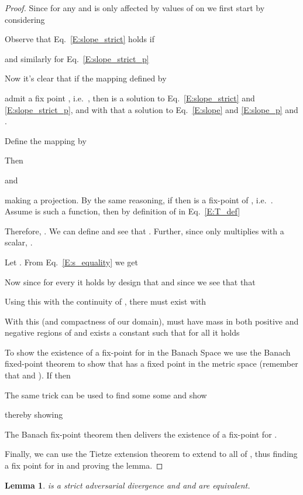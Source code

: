 \documentclass{article}
\newtheorem{lemma}{Lemma}
\begin{document}
 \begin{proof}
  Since  for any  and is only affected by
  values of  on  we first start by considering
  
  Observe that Eq.\ \ref{E:slope_strict} holds if
 
 and similarly for Eq.\ \ref{E:slope_strict_p}
 
 Now it's clear that if the mapping  defined by
 
  admit a fix point , i.e.\ , then  is a solution to Eq.\ \ref{E:slope_strict} and \ref{E:slope_strict_p},
  and with that a solution to Eq.\ \ref{E:slope} and \ref{E:slope_p} and .

  Define the mapping  by
  
  Then
  
  and
  
  making  a projection.
  By the same reasoning, if 
  then  is a fix-point of , i.e.\ .
  Assume  is such a function, then by definition  of  in Eq.\ \ref{E:T_def}
  
  Therefore, . We can define  and see that .
  Further, since  only multiplies with a scalar, .

  Let . From Eq.\ \ref{E:s_equality} we get
  
  Now since for every  it holds by design that 
  and since  we see that  that
  
  Using this with the continuity of , there must exist  with
  
  With this (and compactness of our domain),
   must have mass in both positive and negative regions of  and exists a constant  such that for all
   it holds
  

  To show the existence of a fix-point for  in the Banach Space  we use the Banach fixed-point theorem
  to show that  has a fixed point in the metric space  (remember that  and ).
  If  then
  
 The same trick can be used to find some some  and show
 
 thereby showing
 
 The Banach fix-point theorem then delivers the existence of a fix-point  for .

 Finally, we can use the Tietze extension theorem to extend 
 to all of , thus finding a fix point for  in  and proving the lemma.
 \end{proof}


 \begin{lemma}\label{L:equavent}
   is a strict adversarial divergence and  and  are equivalent.
 \end{lemma}
\end{document}
